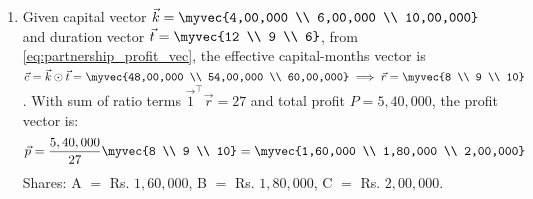 \begin{enumerate}[label=\thesubsection.\arabic*, ref=\thesubsection.\theenumi]
\begin{enumerate}[label=\brak{\alph*}]
\begin{figure}[H]
			The following code stimulates the result.
			\noindent{}
		\end{figure}
		\item Given capital vector $\vec{k} = \myvec{4,00,000 \\ 6,00,000 \\ 10,00,000}$ and duration vector $\vec{t} = \myvec{12 \\ 9 \\ 6}$, from \eqref{eq:partnership_profit_vec}, the effective capital-months vector is $\vec{c} = \vec{k} \odot \vec{t} = \myvec{48,00,000 \\ 54,00,000 \\ 60,00,000} \implies \vec{r} = \myvec{8 \\ 9 \\ 10}$.
		With sum of ratio terms $\vec{1}^{\top}\vec{r} = 27$ and total profit $P = 5,40,000$, the profit vector is:
		\begin{align}
			\vec{p} = \frac{5,40,000}{27}\myvec{8 \\ 9 \\ 10} = \myvec{1,60,000 \\ 1,80,000 \\ 2,00,000}
		\end{align}
		Shares: A $=$ Rs. $1,60,000$, B $=$ Rs. $1,80,000$, C $=$ Rs. $2,00,000$.
		\begin{figure}[H]
			\centering
			\noindent{}
		\end{figure}
	\end{enumerate}
	

\end{enumerate}
